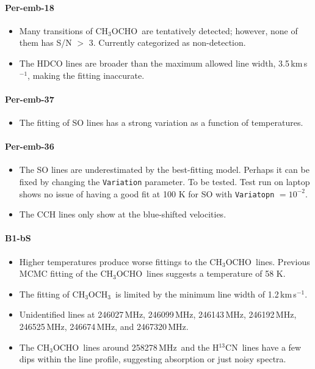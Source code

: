 \documentclass[twocolumn]{aastex62}
\newcommand{\kms}{\mbox{\,km\,s$^{-1}$}}
\newcommand{\mhz}{\mbox{\,MHz}}
\newcommand{\htcn}{\mbox{H$^{13}$CN}}
\newcommand{\methylformate}{\mbox{CH$_{3}$OCHO}}
\newcommand{\dimethylether}{\mbox{CH$_{3}$OCH$_{3}$}}
\begin{document}
\paragraph{Per-emb-18}
\begin{itemize}
  \item Many transitions of \methylformate\ are tentatively detected; however, none of them has S/N $>$ 3.  Currently categorized as non-detection.
  \item The HDCO lines are broader than the maximum allowed line width, 3.5\kms, making the fitting inaccurate.
\end{itemize}

\paragraph{Per-emb-37}
\begin{itemize}
  \item The fitting of SO lines has a strong variation as a function of temperatures.
\end{itemize}

\paragraph{Per-emb-36}
\begin{itemize}
  \item The SO lines are underestimated by the best-fitting model.  Perhaps it can be fixed by changing the \texttt{Variation} parameter.  To be tested.  Test run on laptop shows no issue of having a good fit at 100 K for SO with \texttt{Variatopn} $= 10^{-2}$.
  \item The CCH lines only show at the blue-shifted velocities.
\end{itemize}

\paragraph{B1-bS}
\begin{itemize}
  \item Higher temperatures produce worse fittings to the \methylformate\ lines.  Previous MCMC fitting of the \methylformate\ lines suggests a temperature of 58 K.
  \item The fitting of \dimethylether\ is limited by the minimum line width of 1.2\kms.  
  \item Unidentified lines at 246027\mhz, 246099\mhz, 246143\mhz, 246192\mhz, 246525\mhz, 246674\mhz, and 2467320\mhz.
  \item The \methylformate\ lines around 258278\mhz\ and the \htcn\ lines have a few dips within the line profile, suggesting absorption or just noisy spectra.
\end{itemize}
\end{document}
